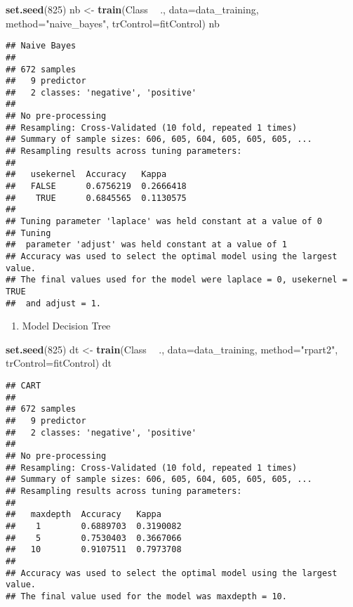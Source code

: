 \documentclass[]{article}
\newenvironment{Shaded}{\begin{snugshade}}{\end{snugshade}}
\newcommand{\DataTypeTok}[1]{\textcolor[rgb]{0.13,0.29,0.53}{#1}}
\newcommand{\DecValTok}[1]{\textcolor[rgb]{0.00,0.00,0.81}{#1}}
\newcommand{\KeywordTok}[1]{\textcolor[rgb]{0.13,0.29,0.53}{\textbf{#1}}}
\newcommand{\NormalTok}[1]{#1}
\newcommand{\OperatorTok}[1]{\textcolor[rgb]{0.81,0.36,0.00}{\textbf{#1}}}
\newcommand{\StringTok}[1]{\textcolor[rgb]{0.31,0.60,0.02}{#1}}
\providecommand{\tightlist}{%
  \setlength{\itemsep}{0pt}\setlength{\parskip}{0pt}}
\begin{document}
\begin{Shaded}
\begin{Highlighting}[]
\KeywordTok{set.seed}\NormalTok{(}\DecValTok{825}\NormalTok{)}
\NormalTok{nb <-}\StringTok{ }\KeywordTok{train}\NormalTok{(Class }\OperatorTok{~}\StringTok{ }\NormalTok{., }
            \DataTypeTok{data=}\NormalTok{data_training, }
            \DataTypeTok{method=}\StringTok{"naive_bayes"}\NormalTok{,}
            \DataTypeTok{trControl=}\NormalTok{fitControl)}
\NormalTok{nb}
\end{Highlighting}
\end{Shaded}

\begin{verbatim}
## Naive Bayes 
## 
## 672 samples
##   9 predictor
##   2 classes: 'negative', 'positive' 
## 
## No pre-processing
## Resampling: Cross-Validated (10 fold, repeated 1 times) 
## Summary of sample sizes: 606, 605, 604, 605, 605, 605, ... 
## Resampling results across tuning parameters:
## 
##   usekernel  Accuracy   Kappa    
##   FALSE      0.6756219  0.2666418
##    TRUE      0.6845565  0.1130575
## 
## Tuning parameter 'laplace' was held constant at a value of 0
## Tuning
##  parameter 'adjust' was held constant at a value of 1
## Accuracy was used to select the optimal model using the largest value.
## The final values used for the model were laplace = 0, usekernel = TRUE
##  and adjust = 1.
\end{verbatim}

\begin{enumerate}
\def\labelenumi{\arabic{enumi}.}
\setcounter{enumi}{1}
\tightlist
\item
  Model Decision Tree
\end{enumerate}

\begin{Shaded}
\begin{Highlighting}[]
\KeywordTok{set.seed}\NormalTok{(}\DecValTok{825}\NormalTok{)}
\NormalTok{dt <-}\StringTok{ }\KeywordTok{train}\NormalTok{(Class }\OperatorTok{~}\StringTok{ }\NormalTok{., }
            \DataTypeTok{data=}\NormalTok{data_training, }
            \DataTypeTok{method=}\StringTok{"rpart2"}\NormalTok{,}
            \DataTypeTok{trControl=}\NormalTok{fitControl)}
\NormalTok{dt}
\end{Highlighting}
\end{Shaded}

\begin{verbatim}
## CART 
## 
## 672 samples
##   9 predictor
##   2 classes: 'negative', 'positive' 
## 
## No pre-processing
## Resampling: Cross-Validated (10 fold, repeated 1 times) 
## Summary of sample sizes: 606, 605, 604, 605, 605, 605, ... 
## Resampling results across tuning parameters:
## 
##   maxdepth  Accuracy   Kappa    
##    1        0.6889703  0.3190082
##    5        0.7530403  0.3667066
##   10        0.9107511  0.7973708
## 
## Accuracy was used to select the optimal model using the largest value.
## The final value used for the model was maxdepth = 10.
\end{verbatim}
\end{document}
